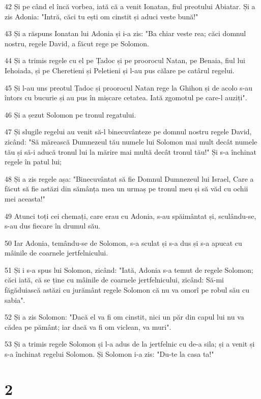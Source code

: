 \par 42 Și pe când el încă vorbea, iată că a venit Ionatan, fiul preotului Abiatar. Și a zis Adonia: "Intră, căci tu ești om cinstit și aduci veste bună!"
\par 43 Și a răspuns Ionatan lui Adonia și i-a zis: "Ba chiar veste rea; căci domnul nostru, regele David, a făcut rege pe Solomon.
\par 44 Și a trimis regele cu el pe Țadoc și pe proorocul Natan, pe Benaia, fiul lui Iehoiada, și pe Cheretieni și Peletieni și l-au pus călare pe catârul regelui.
\par 45 Și l-au uns preotul Țadoc și proorocul Natan rege la Ghihon și de acolo s-au întors cu bucurie și au pus în mișcare cetatea. Iată zgomotul pe care-l auziți".
\par 46 Și a șezut Solomon pe tronul regatului.
\par 47 Și slugile regelui au venit să-l binecuvânteze pe domnul nostru regele David, zicând: "Să mărească Dumnezeul tău numele lui Solomon mai mult decât numele tău și să-i aducă tronul lui la mărire mai multă decât tronul tău!" Și s-a închinat regele în patul lui;
\par 48 Și a zis regele așa: "Binecuvântat să fie Domnul Dumnezeul lui Israel, Care a făcut să fie astăzi din sămânța mea un urmaș pe tronul meu și să văd cu ochii mei aceasta!"
\par 49 Atunci toți cei chemați, care erau cu Adonia, s-au spăimântat și, sculându-se, s-au dus fiecare în drumul său.
\par 50 Iar Adonia, temându-se de Solomon, s-a sculat și s-a dus și s-a apucat cu mâinile de coarnele jertfelnicului.
\par 51 Și i s-a spus lui Solomon, zicând: "Iată, Adonia s-a temut de regele Solomon; căci iată, că se ține cu mâinile de coarnele jertfelnicului, zicând: Să-mi făgăduiască astăzi cu jurământ regele Solomon că nu va omorî pe robul său cu sabia".
\par 52 Și a zis Solomon: "Dacă el va fi om cinstit, nici un păr din capul lui nu va cădea pe pământ; iar dacă va fi om viclean, va muri".
\par 53 Și a trimis regele Solomon și l-a adus de la jertfelnic cu de-a sila; și a venit și s-a închinat regelui Solomon. Și Solomon i-a zis: "Du-te la casa ta!"

\chapter{2}


